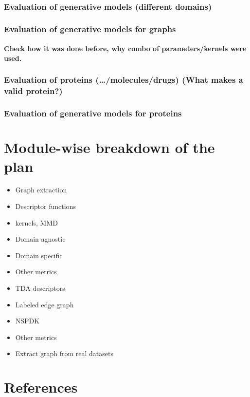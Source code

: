 \documentclass[12pt]{article}
\begin{document}
\subsubsection{Evaluation of generative models (different domains)}
\label{sec:org43c478e}
\subsubsection{Evaluation of generative models for graphs}
\label{sec:org4595ee5}
\paragraph{Check how it was done before, why combo of parameters/kernels were used.}
\label{sec:org02b8637}
\subsubsection{Evaluation of proteins (…/molecules/drugs) (What makes a valid protein?)}
\label{sec:org43f04ad}
\subsubsection{Evaluation of generative models for proteins}
\label{sec:org7a61ae4}
\section{Module-wise breakdown of the plan}
\label{sec:org0671e8e}
\begin{itemize}
\item Graph extraction
\item Descriptor functions
\item kernels, MMD
\item Domain agnostic
\item Domain specific
\item Other metrics
\item TDA descriptors
\item Labeled edge graph
\item NSPDK
\item Other metrics
\item Extract graph from real datasets
\end{itemize}

\section{References}
\label{sec:orgb22ccfb}
\printbibliography[heading=none]
\end{document}
